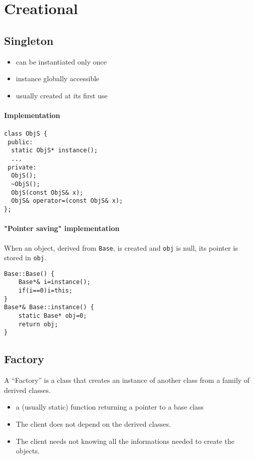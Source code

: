 \documentclass{article}
\begin{document}
\section{Creational}



\subsection{Singleton}
\begin{itemize}
 \item can be instantiated only once
 \item instance globally accessible
 \item usually created at its first use 
\end{itemize}

\paragraph{Implementation}
\begin{lstlisting}
class ObjS {
 public:
  static ObjS* instance();
  ...
 private:
  ObjS();
  ~ObjS();
  ObjS(const ObjS& x);
  ObjS& operator=(const ObjS& x);
};
\end{lstlisting}

\paragraph{"Pointer saving" implementation}
When an object, derived from \texttt{Base}, is created and \texttt{obj} is null, its pointer is stored in \texttt{obj}.
\begin{lstlisting}
Base::Base() {
	Base*& i=instance();
	if(i==0)i=this;
}
Base*& Base::instance() {
	static Base* obj=0;
	return obj;
}
\end{lstlisting}





\subsection{Factory}
A “Factory” is a class that creates an instance of another class from a family of derived classes.

\begin{itemize}
 \item a (usually static) function returning a pointer to a base class
 \item The client does not depend on the derived classes.
 \item The client needs not knowing all the informations needed to
create the objects.
\end{itemize} 
\end{document}
